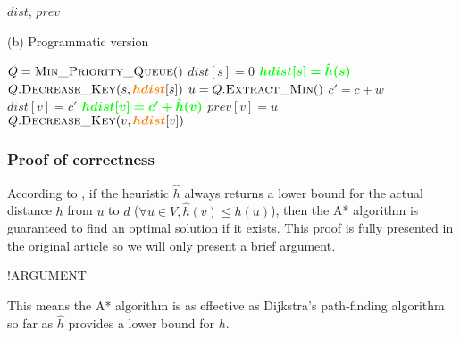 \begin{center}
\begin{algorithm}[H]
\begin{minipage}[t]{0.49\linewidth}
\begin{algorithmic}[1]
                    \EndWhile
                    \State \Return $dist$, $prev$
                \EndFunction
            \end{algorithmic}
        \end{minipage}
        \begin{minipage}[t]{0.49\linewidth}
            (b) Programmatic version
            \begin{algorithmic}[1]
                    \State $Q = \Call{Min\_Priority\_Queue}{ }$
                    \EndFor
                    \State $dist[s] = 0$
                    \State $\textcolor{green}{\bm{hdist[s] = \hat{h}(s)}}$
                    \State $Q.\Call{Decrease\_Key}{s, \textcolor{orange}{\bm{hdist}}[s]}$
                        \State $u = Q.\Call{Extract\_Min}{ }$
                            \State $c' = c + w$
                                \State $dist[v] = c'$
                                \State $\textcolor{green}{\bm{hdist[v] = c'+\hat{h}(v)}}$
                                \State $prev[v] = u$
                                \State $Q.\Call{Decrease\_Key}{v, \textcolor{orange}{\bm{hdist}}[v]}$
                            \EndIf
                        \EndFor
                    \EndWhile
                    \State {}
                \EndFunction
            \end{algorithmic}
        \end{minipage}
    \end{algorithm}
\end{center}
\subsubsection{Proof of correctness}
According to \cite{Astar}, if the heuristic $\hat{h}$ always returns a lower bound for the actual distance $h$ from $u$ to $d$ ($\forall u \in V, \hat{h}(v) \leq h(u)$), then the A* algorithm is guaranteed to find an optimal solution if it exists. This proof is fully presented in the original article so we will only present a brief argument.\par
!ARGUMENT\par
This means the A* algorithm is as effective as Dijkstra's path-finding algorithm so far as $\hat{h}$ provides a lower bound for $h$.

